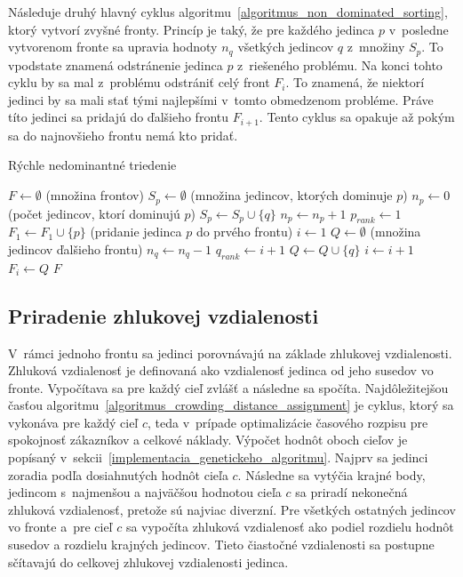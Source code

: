 Následuje druhý hlavný cyklus algoritmu~\ref{algoritmus_non_dominated_sorting}, ktorý vytvorí zvyšné fronty.
Princíp je taký, že pre každého jedinca $p$ v~posledne vytvorenom fronte sa upravia hodnoty $n_q$ všetkých jedincov $q$ z~množiny $S_p$.
To vpodstate znamená odstránenie jedinca $p$ z~riešeného problému.
Na konci tohto cyklu by sa mal z~problému odstrániť celý front $F_i$.
To znamená, že niektorí jedinci by sa mali stať tými najlepšími v~tomto obmedzenom probléme.
Práve títo jedinci sa pridajú do ďalšieho frontu $F_{i+1}$.
Tento cyklus sa opakuje až pokým sa do najnovšieho frontu nemá kto pridať.

\begin{algorithm}[h]\label{algoritmus_non_dominated_sorting}
\caption{Rýchle nedominantné triedenie}
  $F \gets \emptyset$ (množina frontov)\;
   {
    $S_p \gets \emptyset$ (množina jedincov, ktorých dominuje $p$)\;
    $n_p \gets 0$ (počet jedincov, ktorí dominujú $p$)\;
     {
       {
        $S_p \gets S_p \cup \{q\}$\;
      }
       {
        $n_p \gets n_p + 1$\;
      }
    }
     {
      $p_{rank} \gets 1$\;
      $F_1 \gets F_1 \cup \{p\}$ (pridanie jedinca $p$ do prvého frontu)\;
    }
  }
  $i \gets 1$\;
   {
    $Q \gets \emptyset$ (množina jedincov ďalšieho frontu)\;
     {
       {
        $n_q \gets n_q - 1$\;
         {
          $q_{rank} \gets i + 1$\;
          $Q \gets Q \cup \{q\}$\;
        }
      }
    }
    $i \gets i + 1$\;
    $F_i \gets Q$\;
  }
  \Return $F$\;
\end{algorithm}

\subsection*{Priradenie zhlukovej vzdialenosti}
V~rámci jednoho frontu sa jedinci porovnávajú na základe zhlukovej vzdialenosti.
Zhluková vzdialenosť je definovaná ako vzdialenosť jedinca od jeho susedov vo fronte.
Vypočítava sa pre každý cieľ zvlášť a následne sa spočíta.
Najdôležitejšou časťou algoritmu~\ref{algoritmus_crowding_distance_assignment} je cyklus, ktorý sa vykonáva pre každý cieľ $c$, teda v~prípade optimalizácie časového rozpisu pre spokojnosť zákazníkov a celkové náklady.
Výpočet hodnôt oboch cieľov je popísaný v~sekcii~\ref{implementacia_genetickeho_algoritmu}.
Najprv sa jedinci zoradia podľa dosiahnutých hodnôt cieľa $c$.
Následne sa vytýčia krajné body, jedincom s~najmenšou a najväčšou hodnotou cieľa $c$ sa priradí nekonečná zhluková vzdialenosť, pretože sú najviac diverzní.
Pre všetkých ostatných jedincov vo fronte a~pre cieľ $c$ sa vypočíta zhluková vzdialenosť ako podiel rozdielu hodnôt susedov a rozdielu krajných jedincov.
Tieto čiastočné vzdialenosti sa postupne sčítavajú do celkovej zhlukovej vzdialenosti jedinca.

